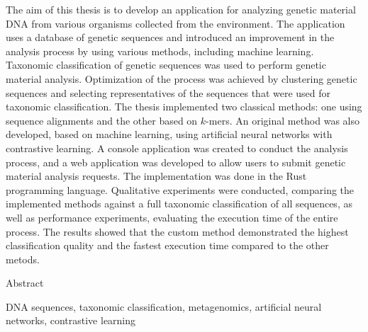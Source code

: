 \cleardoublepage{}

\secondabstract{}
The aim of this thesis is to develop an application for analyzing genetic material DNA from various organisms collected from the environment. The application uses a database of genetic sequences and introduced an improvement in the analysis process by using various methods, including machine learning.
Taxonomic classification of genetic sequences was used to perform genetic material analysis. Optimization of the process was achieved by clustering genetic sequences and selecting representatives of the sequences that were used for taxonomic classification. The thesis implemented two classical methods: one using sequence alignments and the other based on $k$-mers. An original method was also developed, based on machine learning, using artificial neural networks with contrastive learning. A console application was created to conduct the analysis process, and a web application was developed to allow users to submit genetic material analysis requests. The implementation was done in the Rust programming language.
Qualitative experiments were conducted, comparing the implemented methods against a full taxonomic classification of all sequences, as well as performance experiments, evaluating the execution time of the entire process. The results showed that the custom method demonstrated the highest classification quality and the fastest execution time compared to the other metods.

Abstract

\secondkeywords{}
DNA sequences, taxonomic classification,  metagenomics, artificial neural networks, contrastive learning
